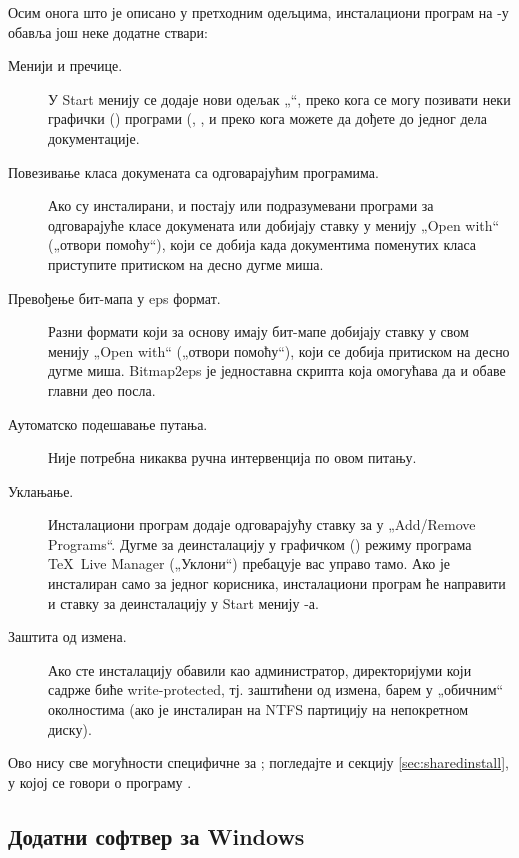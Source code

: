 \documentclass{article}
\begin{document}
Осим онога што је описано у претходним одељцима, инсталациони програм
на \Windows{}-у обавља још неке додатне ствари:
\begin{description}
\item[Менији и пречице.] У Start менију се додаје нови одељак
  „\TL{}“, преко кога се могу позивати неки графички (\GUI{}) програми
  (, , и преко кога можете да дођете до 
  једног дела документације.
\item[Повезивање класа докумената са одговарајућим програмима.] Ако су
  инсталирани,  и  постају
  или подразумевани програми за одговарајуће класе докумената или
  добијају ставку у менију „\textenglish{Open with}“ („отвори помоћу“),
  који се добија када документима поменутих класа приступите притиском
  на десно дугме миша.
\item[Превођење бит-мапа у eps формат.] Разни формати који за основу
  имају бит-мапе добијају ставку  у свом менију
  „\textenglish{Open with}“ („отвори помоћу“), који се добија притиском
  на десно дугме миша. Bitmap2eps је једноставна скрипта која омогућава
  да  и  обаве главни део посла.
\item[Аутоматско подешавање путања.] Није потребна никаква ручна
  интервенција по овом питању.
\item[Уклањање.] Инсталациони програм додаје одговарајућу
  ставку за \TL{} у „\textenglish{Add/Re\-mo\-ve Programs}“. Дугме
  за деинсталацију у графичком (\GUI) режиму програма
  \textenglish{\TeX\ Live Manager} („Уклони“) пребацује вас управо
  тамо. Ако је \TL{} инсталиран само за једног корисника, инсталациони
  програм ће направити и ставку за деинсталацију у \textenglish{Start}
  менију \Windows{}-а.
\item[Заштита од измена.] Ако сте инсталацију обавили као администратор,
  директоријуми који садрже \TL{} биће \textenglish{write-protected},
  тј. заштићени од измена, барем у „обичним“ околностима (ако је \TL{}
  инсталиран на NTFS партицију на непокретном диску).
\end{description}

Ово нису све могућности специфичне за \Windows{}; погледајте и секцију
\ref{sec:sharedinstall}, у којој се говори о програму
.


\subsection{Додатни софтвер за Windows}
\end{document}
